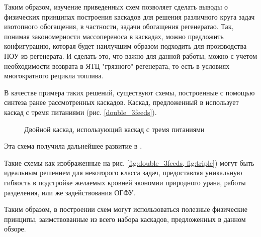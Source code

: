 Таким образом, изучение приведенных схем позволяет сделать выводы о физических принципах построения каскадов для решения различного круга задач изотопного обогащения, в частности, задачи обогащения регенератао. 
Так, понимая закономерности массопереноса в каскадах, можно предложить конфигурацию, которая будет наилучшим образом подходить для производства НОУ из регенерата.
И сделать это, что важно для данной работы, можно с учетом необходимости возврата в ЯТЦ "грязного" регенерата, то есть в условиях многократного рецикла топлива.

В качестве примера таких решений, существуют схемы, построенные с помощью синтеза ранее рассмотренных каскадов.
Каскад, предложенный в \cite{smirnovDilutionRecycledUranium2015} использует каскад с тремя питаниями  (рис. \ref{double_3feeds}).
\begin{figure}[ht]
  \caption{Двойной каскад, использующий каскад с тремя питаниями}\label{fig:double_3feeds}
\end{figure}

Эта схема получила дальнейшее развитие в \cite{smirnovEvaluatingEffectivenessDilution2016}.

Такие схемы как изображенные на рис. \ref{fig:double_3feeds, fig:triple}) могут быть идеальным решением для некоторого класса задач, предоставляя уникальную гибкость в подстройке желаемых кровней экономии природного урана, работы разделения, или же задействования ОГФУ.

Таким образом, в построении схем могут использоваться полезные физические принципы, заимствованные из всего набора каскадов, предложенных в данном обзоре.

